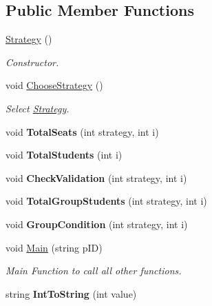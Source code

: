 \subsection*{Public Member Functions}
\begin{DoxyCompactItemize}
\item 
\hyperlink{classStrategy_a2021a15bbc4f0d13f7b92f8933db2235}{Strategy} ()
\begin{DoxyCompactList}\small\item\em Constructor. \end{DoxyCompactList}\item 
\hypertarget{classStrategy_a26160fe07397c93179a75270056ca1a0}{void \hyperlink{classStrategy_a26160fe07397c93179a75270056ca1a0}{Choose\-Strategy} ()}\label{classStrategy_a26160fe07397c93179a75270056ca1a0}

\begin{DoxyCompactList}\small\item\em Select \hyperlink{classStrategy}{Strategy}. \end{DoxyCompactList}\item 
\hypertarget{classStrategy_a5d95968da6695ddc108341c2402d0be4}{void {\bfseries Total\-Seats} (int strategy, int i)}\label{classStrategy_a5d95968da6695ddc108341c2402d0be4}

\item 
\hypertarget{classStrategy_aeb83d384bc21ef9a4e522f890cfd2a72}{void {\bfseries Total\-Students} (int i)}\label{classStrategy_aeb83d384bc21ef9a4e522f890cfd2a72}

\item 
\hypertarget{classStrategy_a6d6c096543de16317252cf9ae1572e2e}{void {\bfseries Check\-Validation} (int strategy, int i)}\label{classStrategy_a6d6c096543de16317252cf9ae1572e2e}

\item 
\hypertarget{classStrategy_ae136891771eb258c0062e0f5feb8b29e}{void {\bfseries Total\-Group\-Students} (int strategy, int i)}\label{classStrategy_ae136891771eb258c0062e0f5feb8b29e}

\item 
\hypertarget{classStrategy_a7e76aa724063b44a471679eabb31e011}{void {\bfseries Group\-Condition} (int strategy, int i)}\label{classStrategy_a7e76aa724063b44a471679eabb31e011}

\item 
void \hyperlink{classStrategy_a7d4c0323880066ee2815a3b3f20b61ea}{Main} (string p\-I\-D)
\begin{DoxyCompactList}\small\item\em Main Function to call all other functions. \end{DoxyCompactList}\item 
\hypertarget{classStrategy_ab92d15ccf4d4d775f4bf9636248fba8f}{string {\bfseries Int\-To\-String} (int value)}\label{classStrategy_ab92d15ccf4d4d775f4bf9636248fba8f}


\end{DoxyCompactItemize}
